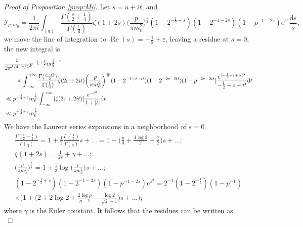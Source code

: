 \documentclass[12pt,reqno]{amsart}
\numberwithin{equation}{section}
\theoremstyle{plain}
\theoremstyle{definition}
\theoremstyle{remark}
\renewcommand{\Re}{\operatorname{Re}}
\newcommand{\dd}{\mathrm{d}}
\begin{document}
\begin{proof}[Proof of Proposition \ref{prop:Mi}]
Let $s=u+it$, and
\begin{equation*}
  \mathcal{I}_{p,m_0}=\frac{1}{2\pi i}
  \int_{(u)}
\frac{\Gamma(\frac{s}{2}+\frac{1}{4})}
{\Gamma(\frac{1}{4})}
\zeta(1+2s)
\bigg(\frac{p}{\pi m_0^2}\bigg)^{\frac{s}{2}}
(1-2^{-\frac{1}{2}+s})
(1-2^{-1-2s})
(1-p^{-1-2s})
e^{s^2}\frac{\dd s}{s},
\end{equation*}
we move the line of integration to $\Re(s)=-\frac{1}{2}+\varepsilon$,
leaving a residue at $s=0$,
the new integral is
\begin{equation*}
\begin{split}
  &\frac{1}{2 \pi^{3/4 + \varepsilon/2}}
  p^{-\frac{1}{4}+\frac{\varepsilon}{2}} m_0^{\frac{1}{2}-\varepsilon}\\
&\hskip 20pt\times
\int_{-\infty}^{+\infty}
\frac{\Gamma(\frac{\varepsilon+it}{2})}
{\Gamma(\frac{1}{4})}
\zeta(2\varepsilon+2it)
\bigg(\frac{p}{\pi m_0^2}\bigg)^{\frac{it}{2}}
(1-2^{-1+\varepsilon+it})
(1-2^{-2\varepsilon-2it})
(1-p^{-2\varepsilon-2it})
\frac{e^{(-\frac{1}{2}+\varepsilon+it)^2}}
{-\frac{1}{2}+\varepsilon+it}\dd t\\
&\ll p^{-\frac{1}{4}+\varepsilon}
m_0^{\frac{1}{2}}
\int_{-\infty}^{+\infty}
|\zeta(2\varepsilon+2it)|
\frac{e^{-t^2}}{1+|t|} \dd t\\
&\ll p^{-\frac{1}{4}+\varepsilon}
m_0^{\frac{1}{2}}.
\end{split}
\end{equation*}
We have the Laurent series expansions in a neighborhood of $s=0$
\begin{equation*}
\begin{gathered}
\frac{\Gamma(\frac{s}{2}+\frac{1}{4})}
{\Gamma(\frac{1}{4})}
=1+\frac{1}{2}\frac{\Gamma^{'}(\frac{1}{4})}
{\Gamma(\frac{1}{4})}s+\dots
=1-\bigg(\frac{\pi}{4}+\frac{3\log 2}{2} +\frac{\gamma}{2}\bigg)s+\dots;\\
\zeta(1+2s)=\frac{1}{2s}+\gamma+\dots;\\
\bigg(\frac{p}{\pi m_0^2}\bigg)
^{\frac{s}{2}}=1+\frac{1}{2}
\log\bigg(\frac{p}{\pi m_0^2}\bigg)s+\dots;\\
(1-2^{-\frac{1}{2}+s})
(1-2^{-1-2s})
(1-p^{-1-2s})
e^{s^2}
=2^{-1}(1-2^{-\frac{1}{2}})
(1-p^{-1})
\\ \times
\bigg(1+\bigg(2+2\log 2+\frac{2\log p}{p-1}-\frac{\log 2}{\sqrt{2}-1}\bigg)s+\dots\bigg);
\end{gathered}
\end{equation*}
where $\gamma$ is the Euler constant.
It follows that the residues can be written as
\begin{equation}\label{eq:residue}

\end{equation}
\end{proof}
\end{document}
